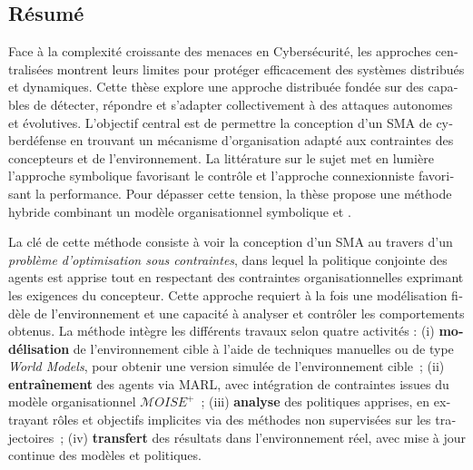 \renewcommand{\abstractname}{Abstract}
\begingroup
\let\clearpage\relax
\let\cleardoublepage\relax
\let\cleardoublepage\relax

\begin{otherlanguage}{ngerman}
  \chapter*{Résumé}

  Face à la complexité croissante des menaces en Cybersécurité, les approches centralisées montrent leurs limites pour protéger efficacement des systèmes distribués et dynamiques. Cette thèse explore une approche distribuée fondée sur des  capables de détecter, répondre et s'adapter collectivement à des attaques autonomes et évolutives.
  L'objectif central est de permettre la conception d'un SMA de cyberdéfense en trouvant un mécanisme d'organisation adapté aux contraintes des concepteurs et de l'environnement. La littérature sur le sujet met en lumière l'approche symbolique favorisant le contrôle et l'approche connexionniste favorisant la performance. Pour dépasser cette tension, la thèse propose une méthode hybride combinant un modèle organisationnel symbolique et .

  La clé de cette méthode consiste à voir la conception d'un SMA au travers d'un \textit{problème d'optimisation sous contraintes}, dans lequel la politique conjointe des agents est apprise tout en respectant des contraintes organisationnelles exprimant les exigences du concepteur. Cette approche requiert à la fois une modélisation fidèle de l'environn\-ement et une capacité à analyser et contrôler les comportements obtenus.
  La méthode intègre les différents travaux selon quatre activités : (i) \textbf{modélisation} de l'environnement cible à l'aide de techniques manuelles ou de type \textit{World Models}, pour obtenir une version simulée de l'environnement cible~; (ii) \textbf{entraînement} des agents via MARL, avec intégration de contraintes issues du modèle organisationnel $\mathcal{M}OISE^+$~; (iii) \textbf{analyse} des politiques apprises, en extrayant rôles et objectifs implicites via des méthodes non supervisées sur les trajectoires~; (iv) \textbf{transfert} des résultats dans l'environnement réel, avec mise à jour continue des modèles et politiques.


\end{otherlanguage}
